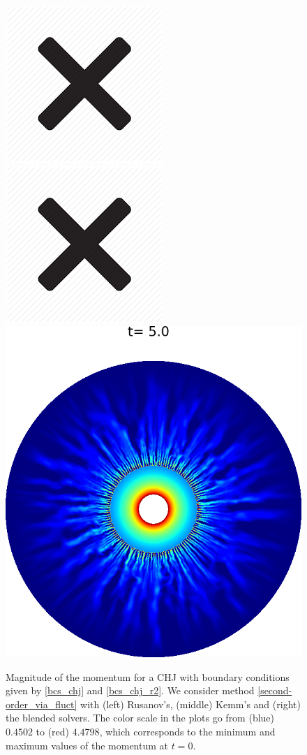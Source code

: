 \documentclass[preprint, 11pt]{article}
\begin{document}
\begin{figure}[!h]
  \centering 
  \includegraphics[scale=0.5]{figures/cross.png} \quad
  \includegraphics[scale=0.5]{figures/cross.png} \quad
  \includegraphics[scale=0.28]{figures/chj_r2_blended_t5p0.png} 
  \caption{Magnitude of the momentum for a CHJ with boundary conditions given by
    \eqref{bcs_chj} and \eqref{bcs_chj_r2}. 
    We consider method \eqref{second-order_via_fluct} with (left) Rusanov's,
    (middle) Kemm's and (right) the blended solvers. 
    The color scale in the plots go from (blue) $0.4502$ to (red) $4.4798$,
    which corresponds to the minimum and maximum values of the momentum at $t=0$.
    \label{fig:chj_r2}}
\end{figure}
\end{document}
